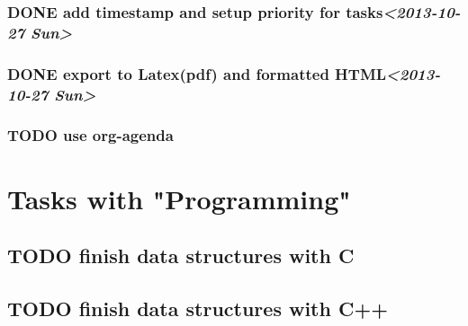 \documentclass[11pt]{article}
\begin{document}
\subsubsection{{\bfseries\sffamily DONE} add timestamp and setup priority for tasks\textit{<2013-10-27 Sun>}}
\label{sec-1-3-3}
\subsubsection{{\bfseries\sffamily DONE} export to Latex(pdf) and formatted HTML\textit{<2013-10-27 Sun>}}
\label{sec-1-3-4}
\subsubsection{{\bfseries\sffamily TODO} use org-agenda}
\label{sec-1-3-5}

\section{Tasks with "Programming"}
\label{sec-2}
\subsection{{\bfseries\sffamily TODO} finish data structures with C}
\label{sec-2-1}
\subsection{{\bfseries\sffamily TODO} finish data structures with C++}
\label{sec-2-2}
\end{document}
